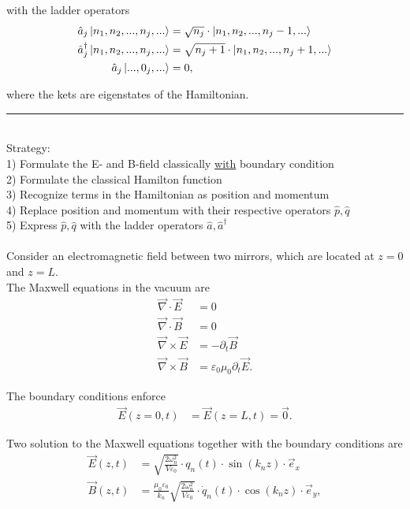 \documentclass{article}
\begin{document}
with the ladder operators
	\begin{align}
		\hat{a}_j \ket{ n_1, n_2, ..., n_j, ...} &= \sqrt{n_j} \cdot \ket{ n_1, n_2, ..., n_j - 1, ...} \\
		\hat{a}_j^\dagger \ket{ n_1, n_2, ..., n_j, ...} &= \sqrt{n_j + 1} \cdot \ket{ n_1, n_2, ..., n_j + 1, ...} \\
		\hat{a}_j \ket{..., 0_j, ...} &= 0,
	\end{align}

where the kets are eigenstates of the Hamiltonian.


\newpage


{\color{violet}
\hrule
	\\
	Strategy:\\
	1) Formulate the E- and B-field classically \underline{with} boundary condition \\
	2) Formulate the classical Hamilton function\\
	3) Recognize terms in the Hamiltonian as position and momentum\\
	4) Replace position and momentum with their respective operators $\hat{p}, \hat{q}$\\
	5) Express $\hat{p}, \hat{q}$ with the ladder operators $\hat{a}, \hat{a}^\dagger$\\
	\\
	Consider an electromagnetic field between two mirrors, which are located at $z=0$ and $z=L$.\\
	The Maxwell equations in the vacuum are
		\begin{align*}
			\vec{\nabla} \cdot \vec{E} &= 0 \\
			\vec{\nabla} \cdot \vec{B} &= 0 \\
			\vec{\nabla} \times \vec{E} &= - \partial_t \vec{B} \\
			\vec{\nabla} \times \vec{B} &= \varepsilon_0\mu_0 \partial_t \vec{E}.
		\end{align*}
	
	The boundary conditions enforce
		\begin{align*}
			\vec{E}(z=0,t) &= \vec{E}(z=L,t) = \vec{0}.
		\end{align*}
	
	Two solution to the Maxwell equations together with the boundary conditions are
		\begin{align*}
			\vec{E}(z,t) &= \sqrt{ \frac{2\omega_n^2}{V\varepsilon_0} } \cdot q_n(t) \cdot \sin(k_n z) \cdot \vec{e}_x \\
			\vec{B}(z,t) &= \frac{ \mu_0 \varepsilon_0 }{k_n} \sqrt{ \frac{2\omega_n^2}{V\varepsilon_0} } \cdot \dot{q}_n(t) \cdot \cos(k_n z) \cdot \vec{e}_y,
		\end{align*}

}
\end{document}
